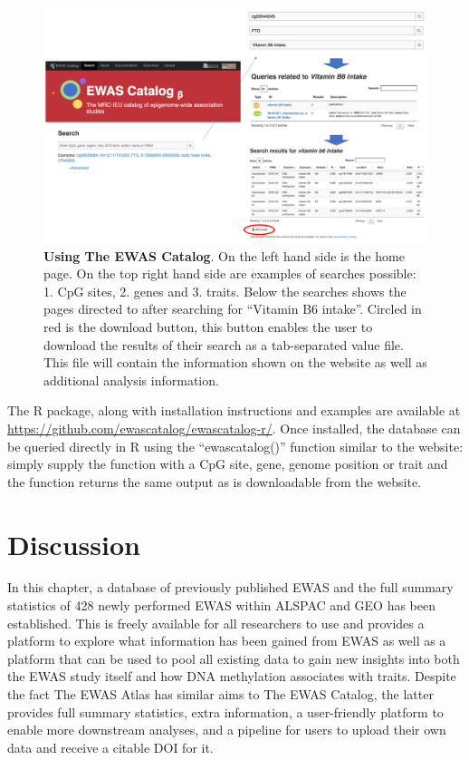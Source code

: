 \documentclass[11pt,twoside]{bristolthesis}
\newcommand{\blandscape}{\begin{landscape}}
\newcommand{\elandscape}{\end{landscape}}
\begin{document}
\blandscape
\begin{figure}[htbp]

{\centering \includegraphics[width=1\linewidth]{figure/03-ewas_catalog/using_the_catalog} 

}

\caption[Using The EWAS Catalog]{\textbf{Using The EWAS Catalog}. On the left hand side is the home page. On the top right hand side are examples of searches possible: 1. CpG sites, 2. genes and 3. traits. Below the searches shows the pages directed to after searching for ``Vitamin B6 intake''. Circled in red is the download button, this button enables the user to download the results of their search as a tab-separated value file. This file will contain the information shown on the website as well as additional analysis information.}\label{fig:catalog-use}
\end{figure}
\elandscape

The R package, along with installation instructions and examples are available at \url{https://github.com/ewascatalog/ewascatalog-r/}. Once installed, the database can be queried directly in R using the ``ewascatalog()'' function similar to the website: simply supply the function with a CpG site, gene, genome position or trait and the function returns the same output as is downloadable from the website.

\hypertarget{discussion-03}{%
\section{Discussion}\label{discussion-03}}

In this chapter, a database of previously published EWAS and the full summary statistics of 428 newly performed EWAS within ALSPAC and GEO has been established. This is freely available for all researchers to use and provides a platform to explore what information has been gained from EWAS as well as a platform that can be used to pool all existing data to gain new insights into both the EWAS study itself and how DNA methylation associates with traits. Despite the fact The EWAS Atlas has similar aims to The EWAS Catalog, the latter provides full summary statistics, extra information, a user-friendly platform to enable more downstream analyses, and a pipeline for users to upload their own data and receive a citable DOI for it.
\end{document}
